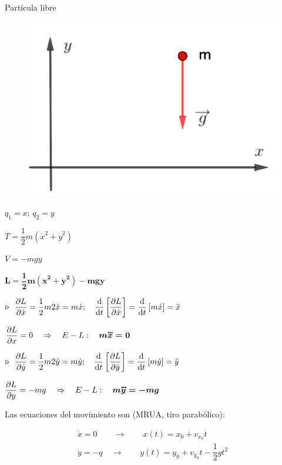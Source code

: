 \vspace{-0.5cm}
\begin{myexampleblock}{Partícula libre}
	\begin{multicols}{2}
		\begin{figure}[H]
		\centering
		\includegraphics[width=.4\textwidth]{imagenes/img03-03.png}
		\end{figure}
		$q_1=x$; $q_2=y$
		
		\vspace{2mm} $T=\dfrac 1 2 m(\dot x^2 + \dot y^2)$
		
		\vspace{2mm} $V=-mgy$
		
		\vspace{4mm} $\boldsymbol{ L=\dfrac 1 2 m(\dot x^2 + \dot y^2)-mgy }$
	\end{multicols}
	
\vspace{3mm} $\triangleright \ \ \displaystyle \pdv{L}{\dot x}=\dfrac 1 2 m 2 \dot x = m\dot x;\quad \dv{t} \left[ \pdv{L}{\dot x}\right] = \dv{t} \left[ m \dot x \right]=\ddot x$

\vspace{3mm} $\displaystyle \pdv{L}{x} =0 \quad \Rightarrow \quad E-L:\quad \boldsymbol{ m\dddot x= 0}$

\vspace{3mm} $\triangleright \ \ \displaystyle \pdv{L}{\dot y}=\dfrac 1 2 m 2 \dot y = m\dot y;\quad \dv{t} \left[ \pdv{L}{\dot y}\right] = \dv{t} \left[ m \dot y \right]=\ddot y$

\vspace{3mm} $\displaystyle \pdv{L}{y} =-mg \quad \Rightarrow \quad E-L:\quad \boldsymbol{ m\dddot y= -mg}$

\vspace{4mm}Las ecuaciones del movimiento son \textcolor{gris}{(MRUA, tiro parabólico)}:

\begin{equation*}
	\begin{array}{l}
	\ddot x=0 \quad  \quad \to \qquad x(t)=x_0+v_{x_0} t
	\\
	\ddot y=-q \quad \to \qquad y(t)=y_0+v_{y_0} t - \dfrac 1 2 g t^2  	
	\end{array}
\end{equation*}


\end{myexampleblock}

